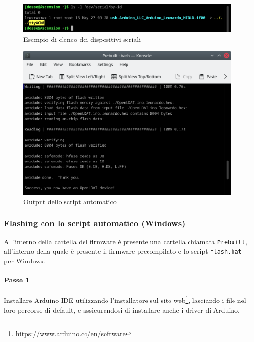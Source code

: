 \begin{figure}[H]
	\centering
	\includegraphics[width=\textwidth]{Dispositivo_files/flashing_01.png}
	\caption{Esempio di elenco dei dispositivi seriali}
	\label{fig:flashing_01}
\end{figure}

\begin{figure}[H]
	\centering
	\includegraphics[width=\textwidth]{Dispositivo_files/flashing_02.png}
	\caption{Output dello script automatico}
	\label{fig:flashing_02}
\end{figure}

\subsubsection{Flashing con lo script automatico (Windows)}
All'interno della cartella del firmware è presente una cartella chiamata \texttt{Prebuilt}, all'interno della quale è presente il firmware precompilato e lo script \texttt{flash.bat} per Windows.

\paragraph{Passo 1} Installare Arduino IDE utilizzando l'installatore sul sito web\footnote{\url{https://www.arduino.cc/en/software}}, lasciando i file nel loro percorso di default, e assicurandosi di installare anche i driver di Arduino.

